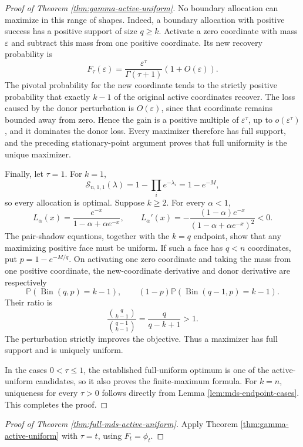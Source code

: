 \documentclass[11pt]{article}
\theoremstyle{definition}
\theoremstyle{remark}
\DeclareMathOperator{\Bin}{Bin}
\newcommand{\Pbb}{\mathbb P}
\newcommand{\1}{\mathbf 1}
\begin{document}
\begin{proof}[Proof of Theorem \ref{thm:gamma-active-uniform}]
No boundary allocation can maximize in this range of shapes.  Indeed, a boundary allocation with positive success has a positive support of size \(q\ge k\).  Activate a zero coordinate with mass \(\varepsilon\) and subtract this mass from one positive coordinate.  Its new recovery probability is
\[
  F_\tau(\varepsilon)
  =\frac{\varepsilon^\tau}{\Gamma(\tau+1)}(1+O(\varepsilon)).
\]
The pivotal probability for the new coordinate tends to the strictly positive probability that exactly \(k-1\) of the original active coordinates recover.  The loss caused by the donor perturbation is \(O(\varepsilon)\), since that coordinate remains bounded away from zero.  Hence the gain is a positive multiple of \(\varepsilon^\tau\), up to \(o(\varepsilon^\tau)\), and it dominates the donor loss.  Every maximizer therefore has full support, and the preceding stationary-point argument proves that full uniformity is the unique maximizer.

Finally, let \(\tau=1\).  For \(k=1\),
\[
  \mathcal S_{n,1,1}(\lambda)
  =1-\prod_i e^{-\lambda_i}=1-e^{-M},
\]
so every allocation is optimal.  Suppose \(k\ge2\).  For every \(\alpha<1\),
\[
  L_\alpha(x)=\frac{e^{-x}}{1-\alpha+\alpha e^{-x}},
  \qquad
  L_\alpha'(x)
  =-\frac{(1-\alpha)e^{-x}}
          {(1-\alpha+\alpha e^{-x})^2}<0.
\]
The pair-shadow equations, together with the \(k=q\) endpoint, show that any maximizing positive face must be uniform.  If such a face has \(q<n\) coordinates, put \(p=1-e^{-M/q}\).  On activating one zero coordinate and taking the mass from one positive coordinate, the new-coordinate derivative and donor derivative are respectively
\[
  \Pbb(\Bin(q,p)=k-1),
  \qquad
  (1-p)\Pbb(\Bin(q-1,p)=k-1).
\]
Their ratio is
\[
  \frac{\binom q{k-1}}{\binom{q-1}{k-1}}
  =\frac q{q-k+1}>1.
\]
The perturbation strictly improves the objective.  Thus a maximizer has full support and is uniquely uniform.

In the cases \(0<\tau\le1\), the established full-uniform optimum is one of the active-uniform candidates, so it also proves the finite-maximum formula.  For \(k=n\), uniqueness for every \(\tau>0\) follows directly from Lemma \ref{lem:mds-endpoint-cases}.  This completes the proof.
\end{proof}

\begin{proof}[Proof of Theorem \ref{thm:full-mds-active-uniform}]
Apply Theorem \ref{thm:gamma-active-uniform} with \(\tau=t\), using \(F_t=\phi_t\).
\end{proof}
\end{document}
